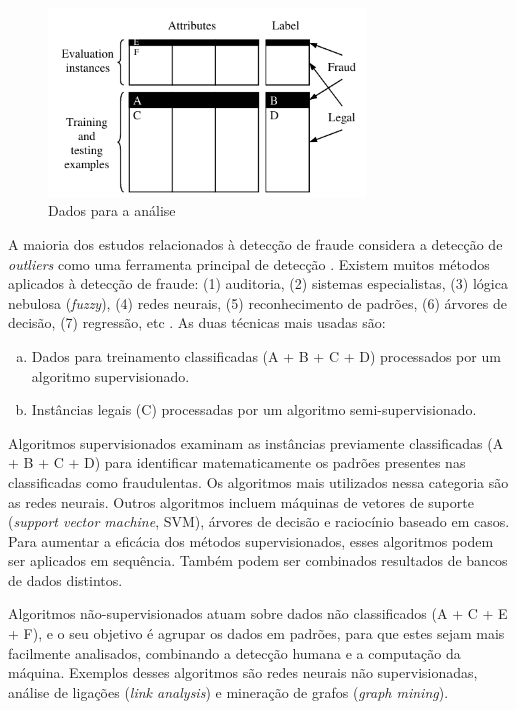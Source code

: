 \begin{figure}[h!]
\centering
\includegraphics[width=0.75\textwidth]{img/fraud-data.png}
\caption{Dados para a análise}
\label{fig:fraud-data}
\end{figure}

A maioria dos estudos relacionados à detecção de fraude considera a detecção de \emph{outliers} como uma ferramenta principal de detecção \cite{Aral2011}. Existem muitos métodos aplicados à detecção de fraude: (1) auditoria, (2) sistemas especialistas, (3) lógica nebulosa (\emph{fuzzy}), (4) redes neurais, (5) reconhecimento de padrões, (6) árvores de decisão, (7) regressão, etc \cite{Huang2010}. As duas técnicas mais usadas são:

\begin{enumerate}[a)]
\item Dados para treinamento classificadas (A + B + C + D) processados por um algoritmo supervisionado.
\item Instâncias legais (C) processadas por um algoritmo semi-supervisionado.
\end{enumerate}

Algoritmos supervisionados examinam as instâncias previamente classificadas (A + B + C + D) para identificar matematicamente os padrões presentes nas classificadas como fraudulentas. Os algoritmos mais utilizados nessa categoria são as redes neurais. Outros algoritmos incluem máquinas de vetores de suporte (\emph{support vector machine}, SVM), árvores de decisão e raciocínio baseado em casos. Para aumentar a eficácia dos métodos supervisionados, esses algoritmos podem ser aplicados em sequência. Também podem ser combinados resultados de bancos de dados distintos.

Algoritmos não-supervisionados atuam sobre dados não classificados (A + C + E + F), e o seu objetivo é agrupar os dados em padrões, para que estes sejam mais facilmente analisados, combinando a detecção humana e a computação da máquina. Exemplos desses algoritmos são redes neurais não supervisionadas, análise de ligações (\emph{link analysis}) e mineração de grafos (\emph{graph mining}).

